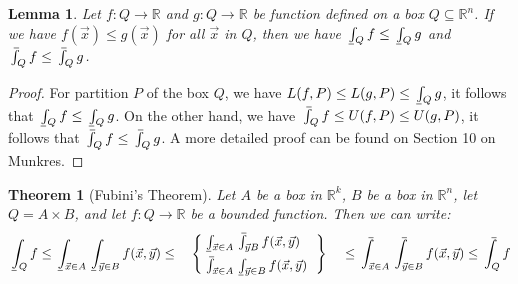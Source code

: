 \documentclass[15pt]{book}
\theoremstyle{break}
\theoremstyle{break}
\newtheorem{thm}{Theorem}[section]
\newtheorem{lem}{Lemma}[thm]
\def\upint{\mathchoice%
    {\mkern13mu\overline{\vphantom{\intop}\mkern7mu}\mkern-20mu}%
    {\mkern7mu\overline{\vphantom{\intop}\mkern7mu}\mkern-14mu}%
    {\mkern7mu\overline{\vphantom{\intop}\mkern7mu}\mkern-14mu}%
    {\mkern7mu\overline{\vphantom{\intop}\mkern7mu}\mkern-14mu}%
  \int}
\def\lowint{\mkern3mu\underline{\vphantom{\intop}\mkern7mu}\mkern-10mu\int}
\newcommand{\R}{\mathbb{R}}
\begin{document}
\begin{lem}
Let $f:Q \to \R$ and $g:Q \to \R$ be function defined on a box $Q \subseteq \R^n$. If we have $f(\vec{x})\leq g(\vec{x})$ for all $\vec{x}$ in $Q$, then we have $\lowint_Q f \leq \lowint_Q g$ and $\upint_Q f \leq \upint_Q g$.
\end{lem}
\begin{proof}
For partition $P$ of the box $Q$, we have $L(f,P) \leq L(g,P) \leq \lowint_Q g$, it follows that $\lowint_Q f \leq \lowint_Q g$. On the  other hand, we have  $\upint_Q f \leq U(f,P) \leq U(g,P)$, it follows that $\upint_Q f \leq \upint_Q g$. A more detailed proof can be found on Section 10 on Munkres. 
\end{proof}

\begin{thm}[Fubini's Theorem]
Let $A$ be a box in $\R^k$, $B$ be a box in $\R^n$, let $Q = A \times B$, and let $f:Q \to \R$ be a bounded function. Then we can write:
$$\lowint_Q f  \leq \lowint_{\vec{x}\in A} \lowint_{\vec{y}\in B}f(\vec{x},\vec{y})\leq \ \ \ \begin{cases}\begin{rcases} \lowint_{\vec{x}\in A} \upint_{\vec{y} B}f(\vec{x},\vec{y}) \\ \upint_{\vec{x}\in A} \lowint_{\vec{y}\in B}f(\vec{x},\vec{y})\ \  \end{rcases}\end{cases}\leq  \upint_{\vec{x}\in A} \upint_{\vec{y}\in B}f(\vec{x},\vec{y})\leq  \upint_Q f$$
\end{thm}
\end{document}
